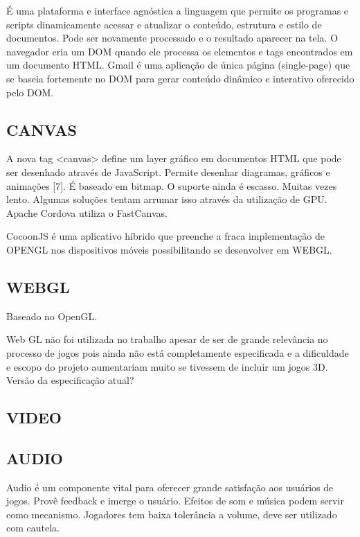 \documentclass[11pt,a4paper]{article}
\begin{document}
É uma plataforma e interface agnóstica a linguagem que permite os programas e scripts dinamicamente acessar e atualizar o conteúdo, estrutura e estilo de documentos. Pode ser novamente processado e o resultado aparecer na tela. O navegador cria um DOM quando ele processa os elementos e tags encontrados em um documento HTML. Gmail é uma aplicação de única página (single-page) que se baseia fortemente no DOM para gerar conteúdo dinâmico e interativo oferecido pelo DOM.

\subsection{ CANVAS}

A nova tag <canvas> define um layer gráfico em documentos HTML que pode ser desenhado através de JavaScript.
Permite desenhar diagramas, gráficos e animações [7]. É baseado em bitmap.
O suporte ainda é escasso.
Muitas vezes lento. Algumas soluções tentam arrumar isso através da utilização de GPU.
Apache Cordova utiliza o FastCanvas.

CocoonJS é uma aplicativo híbrido que preenche a fraca implementação de OPENGL nos dispositivos móveis possibilitando se desenvolver em WEBGL.

\subsection{ WEBGL}

Baseado no OpenGL.

Web GL não foi utilizada no trabalho apesar de ser de grande relevância no processo de jogos pois ainda não está completamente especificada e a dificuldade e escopo do projeto aumentariam muito se tivessem de incluir um jogos 3D.
Versão da especificação atual?

\subsection{ VIDEO}

\subsection{ AUDIO}

Audio é um componente vital para oferecer grande satisfação aos usuários de jogos. Provê feedback e imerge o usuário. Efeitos de som e música podem servir como mecanismo. Jogadores tem baixa tolerância a volume, deve ser utilizado com cautela.
\end{document}
